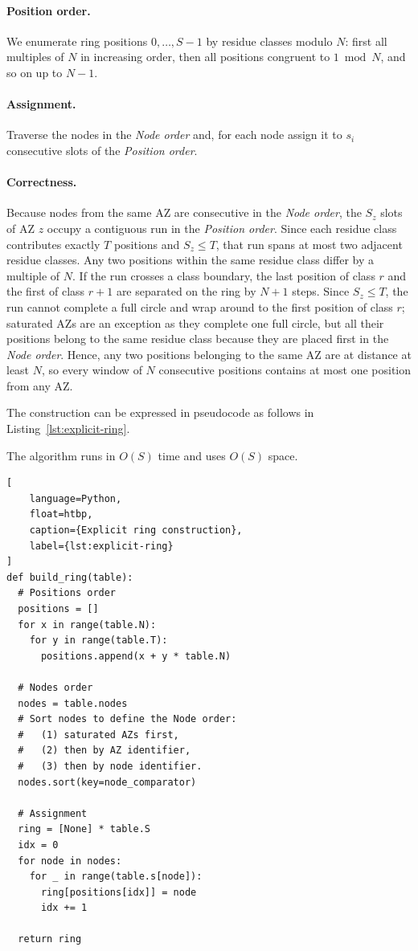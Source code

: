 \paragraph{Position order.}
We enumerate ring positions $0,\dots,S-1$ by residue classes modulo $N$: first
all multiples of $N$ in increasing order, then all positions congruent to
$1\bmod N$, and so on up to $N{-}1$.

\paragraph{Assignment.}
Traverse the nodes in the \emph{Node order} and, for each node assign it to
$s_i$ consecutive slots of the \emph{Position order}.

\paragraph{Correctness.}
Because nodes from the same AZ are consecutive in the \emph{Node order}, the
$S_z$ slots of AZ $z$ occupy a contiguous run in the \emph{Position order}.
Since each residue class contributes exactly $T$ positions and $S_z \le T$,
that run spans at most two adjacent residue classes.
Any two positions within the same residue class differ by a multiple of $N$.
If the run crosses a class boundary, the last position of class $r$ and the
first of class $r + 1$ are separated on the ring by $N + 1$ steps.
Since $S_z \le T$, the run cannot complete a full circle and wrap around to the
first position of class $r$; saturated AZs are an exception as they complete
one full circle, but all their positions belong to the same residue class
because they are placed first in the \emph{Node order}.
Hence, any two positions belonging to the same AZ are at distance at least $N$,
so every window of $N$ consecutive positions contains at most one position from
any AZ.

The construction can be expressed in pseudocode as follows in
Listing~\ref{lst:explicit-ring}.

The algorithm runs in $O(S)$ time and uses $O(S)$ space.

\begin{lstlisting}[
    language=Python,
    float=htbp,
    caption={Explicit ring construction},
    label={lst:explicit-ring}
]
def build_ring(table):
  # Positions order
  positions = []
  for x in range(table.N):
    for y in range(table.T):
      positions.append(x + y * table.N)

  # Nodes order
  nodes = table.nodes
  # Sort nodes to define the Node order:
  #   (1) saturated AZs first,
  #   (2) then by AZ identifier,
  #   (3) then by node identifier.
  nodes.sort(key=node_comparator)

  # Assignment
  ring = [None] * table.S
  idx = 0
  for node in nodes:
    for _ in range(table.s[node]):
      ring[positions[idx]] = node
      idx += 1

  return ring
\end{lstlisting}


